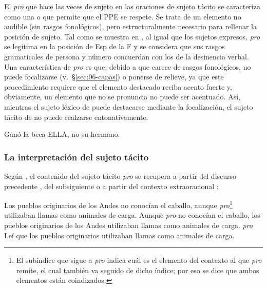 \begin{recuadro}
El \textit{pro} que hace las veces de sujeto en las oraciones de sujeto tácito se
caracteriza como una  o  que permite que
el PPE se respete. Se trata de un elemento no audible (sin rasgos fonológicos),
pero estructuralmente necesario para rellenar la posición de sujeto. Tal como se
muestra en , al igual que los sujetos expresos, \textit{pro}
se legitima en la posición de Esp de la F y se considera que sus rasgos
gramaticales de persona y número concuerdan con los de la desinencia verbal.
Una característica de \textit{pro} es que, debido a que carece de rasgos
fonológicos, no puede focalizarse (v.~§\ref{sec:06-capas}) o ponerse de relieve,
ya que este procedimiento requiere que el elemento destacado reciba acento
fuerte y, obviamente, un elemento que no se pronuncia no puede ser acentuado.
Así, mientras el sujeto léxico de  puede destacarse mediante
la focalización, el sujeto tácito de  no puede realzarse
entonativamente.

\begin{exe}
  \ex
    \begin{xlist}
      \ex\label{ex:06-foco-a} Ganó la beca ELLA, no su hermano.
    \end{xlist}
\end{exe}
\end{recuadro}

\subsubsection{La interpretación del sujeto tácito}

Según \textcite{bosque2009}, el contenido del sujeto tácito \textit{pro} se
recupera a partir del discurso precedente , del
subsiguiente  o a partir del contexto extraoracional
:

\begin{exe}
  \ex\label{ex:06-andes1} Los pueblos originarios de los Andes no
      conocían el caballo, aunque \textit{pro}\footnote{El subíndice que
      sigue a \textit{pro} indica cuál es el elemento del contexto al que
      \textit{pro} remite, el cual también va seguido de dicho índice; por eso
      se dice que ambos elementos están coindizados.} utilizaban llamas como
      animales de carga.
  \ex\label{ex:06-andes2} Aunque \textit{pro} no conocían el caballo, los
      pueblos originarios de los Andes utilizaban llamas como animales de
      carga.
  \ex\label{ex:06-andes3} \textit{pro}\etq{[1.ª pers. sg.]} Leí que los pueblos
      originarios utilizaban llamas como animales de carga.
\end{exe}

